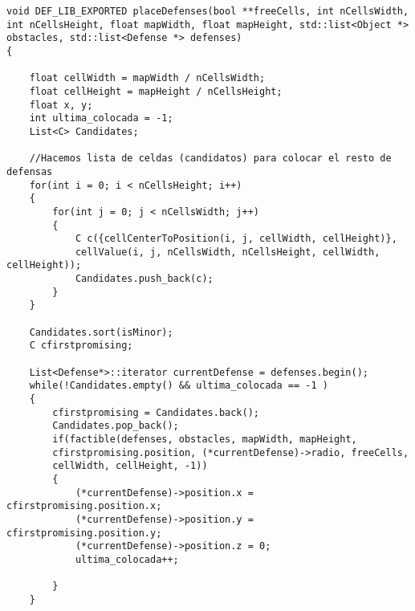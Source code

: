 \begin{lstlisting}
void DEF_LIB_EXPORTED placeDefenses(bool **freeCells, int nCellsWidth, int nCellsHeight, float mapWidth, float mapHeight, std::list<Object *> obstacles, std::list<Defense *> defenses)
{ 

    float cellWidth = mapWidth / nCellsWidth;
    float cellHeight = mapHeight / nCellsHeight;
    float x, y;
    int ultima_colocada = -1;
    List<C> Candidates;

    //Hacemos lista de celdas (candidatos) para colocar el resto de defensas    
    for(int i = 0; i < nCellsHeight; i++)
    {
        for(int j = 0; j < nCellsWidth; j++)
        {
            C c({cellCenterToPosition(i, j, cellWidth, cellHeight)}, 
            cellValue(i, j, nCellsWidth, nCellsHeight, cellWidth, cellHeight));
            Candidates.push_back(c);
        }
    }

    Candidates.sort(isMinor);
    C cfirstpromising;

    List<Defense*>::iterator currentDefense = defenses.begin();
    while(!Candidates.empty() && ultima_colocada == -1 )
    { 
        cfirstpromising = Candidates.back();
        Candidates.pop_back();
        if(factible(defenses, obstacles, mapWidth, mapHeight, 
        cfirstpromising.position, (*currentDefense)->radio, freeCells,
        cellWidth, cellHeight, -1))
        {
            (*currentDefense)->position.x = cfirstpromising.position.x;
            (*currentDefense)->position.y = cfirstpromising.position.y;
            (*currentDefense)->position.z = 0;
            ultima_colocada++;

        }
    }
\end{lstlisting}